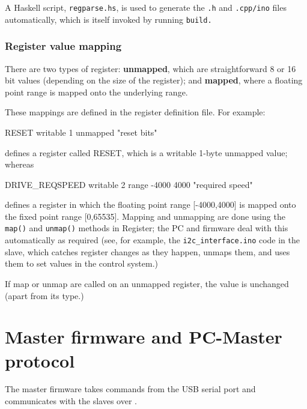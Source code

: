 A Haskell script, \texttt{regparse.hs}, is used to generate
the \texttt{.h} and \texttt{.cpp/ino} files automatically,
which is itself invoked by running \texttt{build.} 

\subsubsection{Register value mapping}
There are two types of register: \textbf{unmapped}, which are straightforward
8 or 16 bit values (depending on the size of the register); and \textbf{mapped},
where a floating point range is mapped onto the underlying range.

These mappings are defined in the register definition file. For example:

\begin{v}
    RESET          writable  1 unmapped      "reset bits"
\end{v}
defines a register called RESET, which is a writable 1-byte unmapped value;
whereas
\begin{v}
    DRIVE_REQSPEED writable  2 range -4000 4000  "required speed"
\end{v}
defines a register in which the floating point range [-4000,4000] is mapped onto
the fixed point range [0,65535].
Mapping and unmapping are done using the \texttt{map()} and \texttt{unmap()} methods
in Register; the PC and firmware deal with this automatically as required (see, for example,
the \texttt{i2c\_interface.ino} code in the slave, which catches register changes as they happen,
unmaps them, and uses them to set values in the control system.)

If map or unmap are called on an unmapped register, the value is unchanged (apart from its type.)

\clearpage
\section{Master firmware and PC-Master protocol}
\label{protoc}
The master firmware takes commands from the USB serial port and communicates
with the slaves over \isqc{}.
